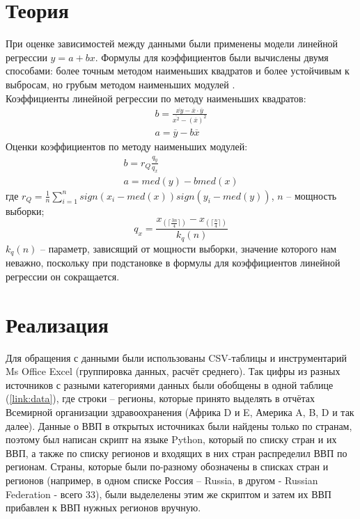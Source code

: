 \documentclass[main.tex]{subfiles}
\begin{document}
\newpage
\section{Теория}
При оценке зависимостей между данными были применены модели линейной регрессии $y=a+bx$. Формулы для коэффициентов были вычислены двумя способами: более точным методом наименьших квадратов и более устойчивым к выбросам, но грубым методом наименьших модулей \cite{sevastianov}.\\
Коэффициенты линейной регрессии по методу наименьших квадратов:
\begin{gather}
\label{eq:least_sq_b}
b = \frac{\overline{xy} - \overline{x}\cdot\overline{y}}{\overline{x^2}-(\overline{x})^2}\\
\label{eq:least_sq_a}
a = \overline{y}-b\overline{x}
\end{gather}
Оценки коэффициентов по методу наименьших модулей:
\begin{gather}
\label{eq:least_mod_b}
b = r_Q \frac{q_y}{q_x}\\
\label{eq:least_mod_a}
a = med(y)-b med(x)
\end{gather}
где $r_Q=\frac{1}{n} \sum_{i=1}^{n} sign(x_i - med(x))sign(y_i-med(y))$, $n$ -- мощность выборки;
\begin{equation}\label{eq:interquartile}
q_x = \frac{x_{(\lceil\frac{3n}{4}\rceil)} - x_{(\lceil\frac{n}{4}\rceil)}}{k_q(n)}
\end{equation}
$k_q(n)$ -- параметр, зависящий от мощности выборки, значение которого нам неважно, поскольку при подстановке в формулы для коэффициентов линейной регрессии он сокращается.

\newpage
\section{Реализация}
Для обращения с данными были использованы CSV-таблицы и инструментарий Ms Office Excel (группировка данных, расчёт среднего). Так цифры из разных источников с разными категориями данных были обобщены в одной таблице (\ref{link:data}), где строки -- регионы, которые принято выделять в отчётах Всемирной организации здравоохранения (Африка D и E, Америка A, B, D и так далее). Данные о ВВП в открытых источниках были найдены только по странам, поэтому был написан скрипт на языке Python, который по списку стран и их ВВП, а также по списку регионов и входящих в них стран распределил ВВП по регионам. Страны, которые были по-разному обозначены в списках стран и регионов (например, в одном списке Россия -- Russia, в другом - Russian Federation - всего 33), были выделелены этим же скриптом и затем их ВВП прибавлен к ВВП нужных регионов вручную.
\end{document}
